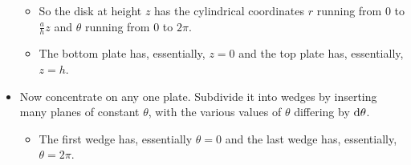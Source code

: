 \begin{eg}
\begin{itemize}
\begin{itemize}
\begin{efig}
\begin{center}
\end{center}
\end{efig} 
\item
So the disk at height $z$ has the 
cylindrical coordinates $r$ running from $0$ to $\frac{a}{h}z$
and $\theta$ running from $0$ to $2\pi$.
\item 
The bottom plate has, essentially, $z=0$ and the top plate has, essentially, 
$z=h$. 
\end{itemize}
\vspace{-\topsep}
\item 
Now concentrate on any one plate. Subdivide it into wedges
by inserting many planes of constant $\theta$, with the various 
values of $\theta$ differing by $\mathrm{d}\theta$. 
\vspace{-\topsep}
\begin{itemize} \itemsep1pt \parskip0pt 
\item
The first wedge has, essentially $\theta=0$ and the last wedge has,
essentially, $\theta=2\pi$.
\end{itemize}
\vspace{-\topsep}


\end{itemize}
\end{eg}
